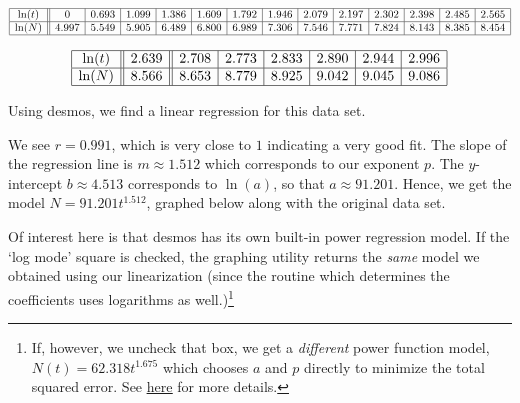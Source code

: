 \documentclass{ximera}
\begin{document}
\[ \begin{array}{|c||c|c|c|c|c|c|c|c|c|c|c|c|c|}  \hline

\ln(t) & 0 & 0.693 & 1.099 & 1.386& 1.609 & 1.792 & 1.946 & 2.079 & 2.197 & 2.302 & 2.398 & 2.485 & 2.565  \\ \hline

\ln(N) & 4.997  & 5.549 &  5.905 & 6.489 & 6.800 & 6.989 & 7.306 & 7.546 & 7.771 & 7.824 & 8.143 & 8.385 & 8.454  \\ \hline \end{array} \]


\[\begin{array}{|c||c||c|c|c|c|c|c|} \hline

\ln(t) & 2.639 & 2.708 & 2.773 & 2.833 & 2.890 & 2.944 & 2.996  \\ \hline 

\ln(N) & 8.566 & 8.653 & 8.779 & 8.925 & 9.042 & 9.045 & 9.086    \\ \hline \end{array} \]

Using desmos, we find a linear regression for this data set.
\begin{center}
\end{center}

We see $r=0.991$, which is very close to $1$ indicating a very good fit.   The slope of the regression line is $m \approx 1.512$ which corresponds to our exponent $p$.  The $y$-intercept $b \approx 4.513$ corresponds to $\ln(a)$, so that $a \approx 91.201$.  Hence, we get the model $N = 91.201 t^{1.512}$, graphed below along with the original data set. 

\begin{center}
\end{center}
 
Of interest here is that desmos has its own built-in power regression model.  If the `log mode'  square is checked, the graphing utility returns the \textit{same} model we obtained using our linearization (since the routine which determines the coefficients uses logarithms as well.)\footnote{If, however, we uncheck that box, we get a \textit{different} power function model, $N(t) = 62.318 t^{1.675}$ which chooses $a$ and $p$ directly to minimize the total squared error.  See \href{http://support.desmos.com/hc/en-us/articles/204349605}{\underline{here}} for more details.}
\end{document}
